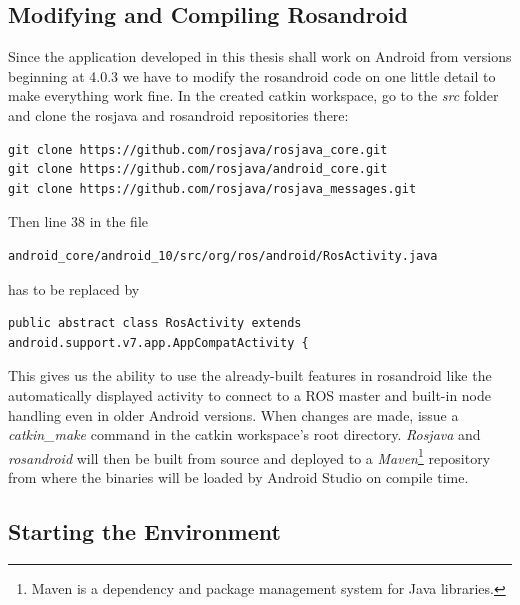 \subsection{Modifying and Compiling Rosandroid}
\label{impl:compiling_rosandroid}

Since the application developed in this thesis shall work on Android from versions beginning at 4.0.3 we have to modify the rosandroid code on one little detail to make everything work fine. In the created catkin workspace, go to the \textit{src} folder and clone the rosjava and rosandroid repositories there:
\begin{lstlisting}[caption={Cloning the rosandroid and rosjava repositories}]
git clone https://github.com/rosjava/rosjava_core.git
git clone https://github.com/rosjava/android_core.git
git clone https://github.com/rosjava/rosjava_messages.git
\end{lstlisting}

Then line 38 in the file
\begin{lstlisting}[numbers=none]
android_core/android_10/src/org/ros/android/RosActivity.java
\end{lstlisting}

has to be replaced by

\begin{lstlisting}[caption={Change to make to RosActivity.java},firstnumber=38]
public abstract class RosActivity extends android.support.v7.app.AppCompatActivity {
\end{lstlisting}

This gives us the ability to use the already-built features in rosandroid like the automatically displayed activity to connect to a ROS master and built-in node handling even in older Android versions. When changes are made, issue a \textit{catkin\_make} command in the catkin workspace's root directory. \textit{Rosjava} and \textit{rosandroid} will then be built from source and deployed to a \textit{Maven}\footnote{Maven is a dependency and package management system for Java libraries.} repository from where the binaries will be loaded by Android Studio on compile time.

\subsection{Starting the Environment}

